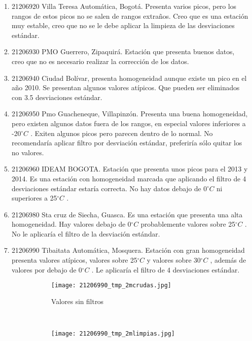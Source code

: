 \documentclass[11pt]{article}
\def\celc{$^{\circ}C$ }%
\begin{document}
\begin{enumerate}
\item 21206920 Villa Teresa Automática, Bogotá. Presenta varios picos, pero los rangos de estos picos no se salen de rangos extraños. Creo que es una estación muy estable, creo que no se le debe aplicar la limpieza de las desviaciones estándar.

\item 21206930 PMO Guerrero, Zipaquirá. Estación que presenta buenos datos, creo que no es necesario realizar la corrección de los datos.

\item 21206940 Ciudad Bolívar, presenta homogeneidad aunque existe un pico en el año 2010. Se presentan algunos valores atípicos. Que pueden ser eliminados con 3.5 desviaciones estándar.

\item 21206950 Pmo Guacheneque, Villapinzón. Presenta una buena homogeneidad, pero existen algunos datos fuera de los rangos, en especial valores inferiores a -20\celc. Exiten algunos picos pero parecen dentro de lo normal. No recomendaría aplicar filtro por desviación estándar, preferiría sólo quitar los no valores.

\item 21206960 IDEAM BOGOTA. Estación que presenta unos picos para el 2013 y 2014. Es una estación con homogeneidad marcada que aplicando el filtro de  4 desviaciones estándar estaría correcta. No hay datos debajo de 0\celc ni superiores a 25\celc.

\item 21206980 Sta cruz de Siecha, Guasca. Es una estación que presenta una alta homogeneidad. Hay valores debajo de 0\celc probablemente valores sobre 25\celc. No le aplicaría el filtro de la desviación estándar.

\item 21206990 Tibaitata Automática, Mosquera. Estación con gran homogeneidad presenta valores atípicos, valores sobre 25\celc y valores sobre 30\celc, además de valores por debajo de 0\celc. Le aplicaría el filtro de 4 desviaciones estándar.


\begin{figure}[H]
	\begin{subfigure}[b]{0.5\textwidth}
	\begin{center}
		\texttt{[image: 21206990\_tmp\_2mcrudas.jpg]}

	\caption{Valores sin filtros}
	\label{subfig:c1}
		\end{center}
	\end{subfigure}
	~
		\begin{subfigure}[b]{0.5\textwidth}
	\begin{center}
		\texttt{[image: 21206990\_tmp\_2mlimpias.jpg]}


\end{center}
\end{subfigure}
\end{figure}
\end{enumerate}
\end{document}
